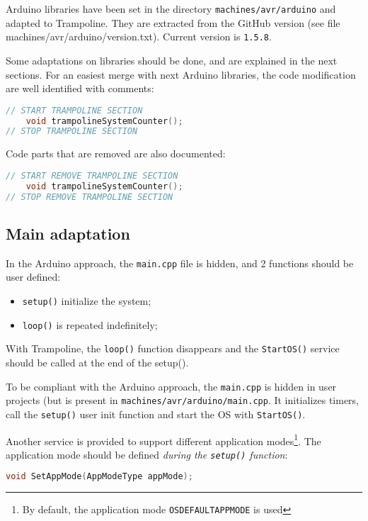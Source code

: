 Arduino libraries have been set in the directory \texttt{machines/avr/arduino} and adapted to Trampoline. They are extracted from the GitHub version (see file machines/avr/arduino/version.txt). Current version is \texttt{1.5.8}.

Some adaptations on libraries should be done, and are explained in the next sections. For an easiest merge with next Arduino libraries, the code modification are well identified with comments:

\begin{lstlisting}[language=C]
// START TRAMPOLINE SECTION 
	void trampolineSystemCounter();
// STOP TRAMPOLINE SECTION 
\end{lstlisting}

Code parts that are removed are also documented:
\begin{lstlisting}[language=C]
// START REMOVE TRAMPOLINE SECTION
	void trampolineSystemCounter();
// STOP REMOVE TRAMPOLINE SECTION
\end{lstlisting}

\subsection{Main adaptation}
In the Arduino approach, the \texttt{main.cpp} file is hidden, and 2 functions should be user defined:
\begin{itemize}
\item \texttt{setup()} initialize the system;
\item \texttt{loop()} is repeated indefinitely;
\end{itemize}

With Trampoline, the \texttt{loop()} function disappears and the \texttt{StartOS()} service should be called at the end of the setup().

To be compliant with the Arduino approach, the \texttt{main.cpp} is hidden in user projects (but is present in \texttt{machines/avr/arduino/main.cpp}. It initializes timers, call the \texttt{setup()} user init function and start the OS with \texttt{StartOS()}. 

Another service is provided to support different application modes\footnote{By default, the application mode \texttt{OSDEFAULTAPPMODE} is used}. The application mode should be defined \emph{during the \texttt{setup()} function}:
\begin{lstlisting}[language=C]
void SetAppMode(AppModeType appMode);
\end{lstlisting}


